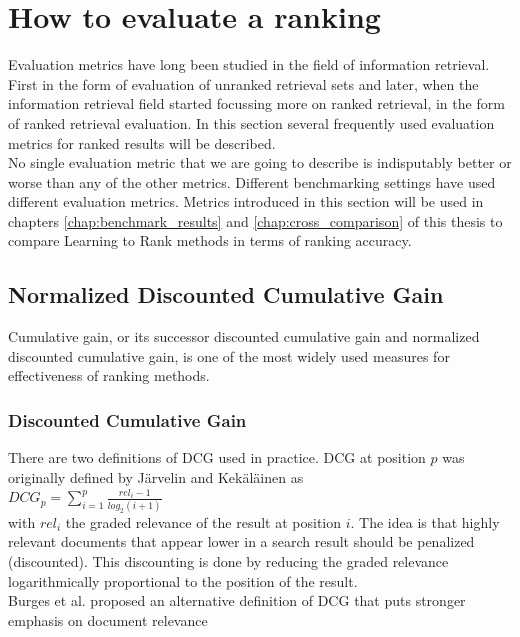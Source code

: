 \section{How to evaluate a ranking}
\label{sec:how_to_evaluate_a_ranking}
Evaluation metrics have long been studied in the field of information retrieval. First in the form of evaluation of unranked retrieval sets and later, when the information retrieval field started focussing more on ranked retrieval, in the form of ranked retrieval evaluation. In this section several frequently used evaluation metrics for ranked results will be described.\\

No single evaluation metric that we are going to describe is indisputably better or worse than any of the other metrics. Different benchmarking settings have used different evaluation metrics. Metrics introduced in this section will be used in chapters \ref{chap:benchmark_results} and \ref{chap:cross_comparison} of this thesis to compare Learning to Rank methods in terms of ranking accuracy.
\subsection{Normalized Discounted Cumulative Gain}
Cumulative gain, or its successor discounted cumulative gain and normalized discounted cumulative gain, is one of the most widely used measures for effectiveness of ranking methods.
\subsubsection{Discounted Cumulative Gain}
There are two definitions of \ac{DCG} used in practice. \ac{DCG} at position $p$ was originally defined by J{\"a}rvelin and Kek{\"a}l{\"a}inen \cite{Jarvelin2002} as\\

$DCG_p = \sum\nolimits_{i=1}^p \frac{rel_i-1}{log_2(i+1)}$\\

with $rel_i$ the graded relevance of the result at position $i$. The idea is that highly relevant documents that appear lower in a search result should be penalized (discounted). This discounting is done by reducing the graded relevance  logarithmically proportional to the position of the result.\\

Burges et al. \cite{Burges2005} proposed an alternative definition of \ac{DCG} that puts stronger emphasis on document relevance\\

